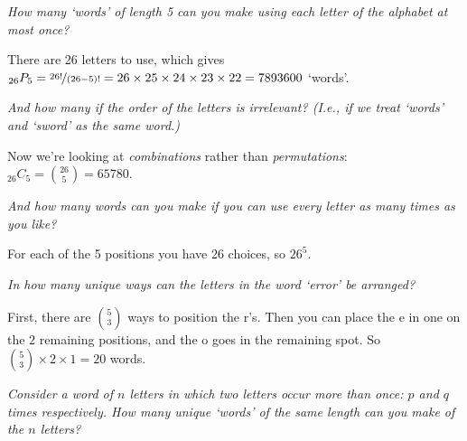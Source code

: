 \documentclass[a4paper,10pt,landscape,twocolumn]{scrartcl}
\begin{document}
\begin{exercise}[Words]

  \begin{subex}\itshape
    How many `words' of length 5 can you make 
    using each letter of the alphabet at most once?
  \end{subex}
  
  \begin{solution}
    There are 26 letters to use, which gives 
    ${}_{26}P_{5} 
      = \nicefrac{26!}{(26-5)!} 
      = 26 \times 25 \times 24 \times 23 \times 22 
      = 7893600$ `words'.
  \end{solution}


  \begin{subex}\itshape
    And how many if the order of the letters is irrelevant? 
    (I.e., if we treat `words'  and `sword' as the same word.)
  \end{subex}
  
  \begin{solution}
    Now we're looking at \emph{combinations} rather than \emph{permutations}:
    ${}_{26}C_{5} = {26 \choose 5} = 65780$.
  \end{solution}
	
	
  \begin{subex}\itshape
    And how many words can you make if you can use every letter as many times
    as you like?
  \end{subex}
  
  \begin{solution}
    For each of the 5 positions you have 26 choices, so $26^5$.
  \end{solution}

  
  \begin{subex}\itshape
    In how many unique ways can the letters in the word `error' be arranged?
  \end{subex}
  
  \begin{solution}
    First, there are ${5 \choose 3}$ ways to position the r's. Then you can
    place the e in one on the $2$ remaining positions, and the o goes in the
    remaining spot. So ${5 \choose 3} \times 2  \times 1 = 20$ words. 
  \end{solution}
  
  
  \begin{subex}\itshape
    Consider a word of $n$ letters in which two letters occur more than once: 
    $p$ and $q$ times respectively. How many unique `words' of the same length
    can you make of the $n$ letters?
  \end{subex}
  

\end{exercise}
\end{document}
